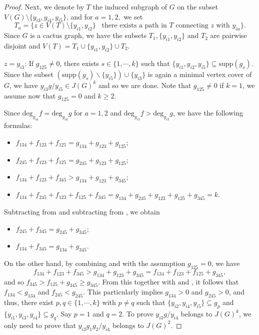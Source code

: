\documentclass[sn-mathphys,Numbered]{sn-jnl}%
\theoremstyle{thmstyleone}%
\theoremstyle{thmstyletwo}%
\theoremstyle{thmstylethree}%
\begin{document}
\begin{proof}
Next, we denote by $T$  the induced subgraph of $G$  on the  subset $V(G)\setminus \{y_{i3},y_{i4},y_{i5}\}$, and for $a=1,2,$ we set
 $$T_a=\{z\in V(T)\setminus \{y_{i1}, y_{i2}\}\:\; \mbox{ there exists a path in } T  \mbox{ connecting } z  \mbox{ with } y_{ia}\}.$$
  Since $G$ is a cactus graph,  we have   the subsets $T_1, \{y_{i1},y_{i2}\}$ and $T_2$ are pairwise disjoint and  $V(T)=T_1\cup \{y_{i1},y_{i2}\} \cup T_2$.


\vspace{2mm}

 $z=y_{i3}$:   If $g_{125}\neq0$, there exists $s \in \{1,\cdots, k\}$ such that $\{y_{i1},y_{i2},y_{i5}\}\subseteq \mathrm{supp}(g_s)$. Since the subset $(\mathrm{supp}(g_s)\backslash\{y_{i5}\})\cup\{y_{i3}\}$ is again a minimal vertex cover of $G$, we have $y_{i3}g/y_{i5} \in J(G)^k$ and so we are done. Note that  $g_{125}\neq 0$ if $k=1$, we  assume now that $g_{125}=0$ and $k\geq2$.

Since  $\mathrm{deg}_{y_{ia}}f=\mathrm{deg}_{y_{ia}}g$ for $a=1,2$  and $\mathrm{deg}_{y_{i3}}f>\mathrm{deg}_{y_{i3}}g$,  we have the following formulas:

 \begin{itemize}\item $f_{134}+f_{123}+f_{125}=g_{134}+g_{123}+g_{125}$;    \hfill{}
 \item $f_{245}+f_{123}+f_{125}=g_{245}+g_{123}+g_{125};$ \hfill{}
 \item $f_{134}+f_{123}+f_{345}>g_{134}+g_{123}+g_{345};$  \hfill{}
 \item $f_{134}+f_{245}+f_{123}+f_{125}+f_{345}=g_{134}+g_{245}+g_{123}+g_{125}+g_{345}=k.$ \hfill{}

  \end{itemize}


  Subtracting  from   and  subtracting  from  , we obtain
  \begin{itemize}
   \item   $f_{245}+f_{345}=g_{245}+g_{345}$; \hfill {}

       \item    $f_{134}+f_{345}=g_{134}+g_{345}$. \hfill {}

        \end{itemize}

   On the other hand, by combining   and  with the assumption $g_{125}=0$, we have
    $$f_{134}+f_{123}+f_{345}>g_{134}+g_{123}+g_{345}=f_{134}+f_{123}+f_{125}+g_{345},$$
    and so  $f_{345}>f_{125}+g_{345}\geq g_{345}$. From this together with   and ,  it follows that
     $f_{134}<g_{134}$ and $f_{245}<g_{245}$. This particularly implies  $g_{134}>0$  and $g_{245}>0$, and thus, there exist $p,q\in \{1,\cdots, k\}$ with $p\neq q$ such that $\{y_{i2},y_{i4},y_{i5}\}\subseteq g_p$ and  $\{y_{i1},y_{i3},y_{i4}\}\subseteq g_q$.  Say $p=1$ and $q=2$. To prove $y_{i3}g/y_{i4}$ belongs to  $J(G)^k$, we only need to prove that $y_{i3}g_1g_2/y_{i4}$ belongs to $J(G)^2$.


\end{proof}
\end{document}
